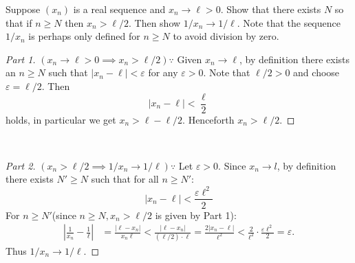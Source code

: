 \documentclass[minion]{homework}
\begin{document}
\begin{problems}

\problem  Suppose $(x_n)$ is a real sequence and $x_n\to \ell > 0$.
Show that there exists $N$ so that if $n\ge N$ then $x_n>\ell/2$.
Then show $1/x_n \to 1/\ell$. Note that the sequence $1/x_n$ is 
perhaps only defined for $n\ge N$ to avoid division by zero.
\newline
\begin{proof}[Part 1] $(x_n \to \ell > 0 \implies x_n > \ell/2) \because$ \newline
  Given $x_n \to \ell$, by definition there exists an $n \geq N$ such that $|x_n - \ell| < \varepsilon$ for any $\varepsilon > 0$. Note that $\ell/2 > 0$ and choose $\varepsilon = \ell/2$. Then 
  $$|x_n - \ell| < \frac{\ell}{2}$$
  holds, in particular we get $x_n > \ell - \ell/2$. Henceforth $x_n > \ell/2$.
\end{proof}$ $
\begin{proof}[Part 2] $(x_n > \ell/2 \implies 1 / x_n \to 1/\ell)\because$
  Let $\varepsilon > 0$. Since $x_n \to l$, by definition there exists $N' \geq N$ such that for all $n \geq N'$:
  $$|x_n - \ell| < \frac{\varepsilon\ell^2}{2}$$
  For $n \geq N'$(since $n \geq N, x_n > \ell / 2$ is given by Part 1):
      \begin{align*}
      \left|\frac{1}{x_n} - \frac{1}{\ell}\right| &= \frac{|\ell - x_n|}{x_n \ell} 
      < \frac{|\ell-x_n|}{(\ell/2)\cdot \ell} 
      = \frac{2|x_n-\ell|}{\ell^2} 
      < \frac{2}{\ell^2}\cdot\frac{\varepsilon\ell^2}{2}
      = \varepsilon.
    \end{align*}
    Thus $1/x_n \to 1/\ell$.
\end{proof}


\end{problems}
\end{document}
